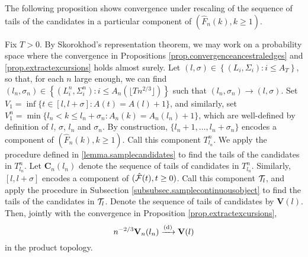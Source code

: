 The following proposition shows convergence under rescaling of the sequence of tails of the candidates in a particular component of $(\hat{F}_n(k),k\geq 1)$. 
\begin{proposition}\label{prop.convergencestartingpointscandidates}
Fix $T>0$. By Skorokhod's representation theorem, we may work on a probability space where the convergence in Propositions \ref{prop.convergenceancestraledges} and \ref{prop.extractexcursions} holds almost surely. Let $(l,\sigma)\in \left\{(L_i,\Sigma_i):i\leq A_T\right\}$, so that, for each $n$ large enough, we can find $(l_n,\sigma_n)\in\left\{(L_i^n,\Sigma_i^n):i\leq A_n\left(\lfloor Tn^{2/3}\rfloor\right)\right\}$ such that $(l_n,\sigma_n)\to (l,\sigma)$. Set $V_1=\inf\{t\in [l,l+\sigma]:A(t)=A(l)+1\}$, and similarly, set $V_1^n=\min\{l_n<k\leq l_n+\sigma_n:A_n(k)=A_n(l_n)+1\}$, which are well-defined by definition of $l$, $\sigma$, $l_n$ and $\sigma_n$. By construction, $\{l_n+1,\dots,l_n+\sigma_n\}$ encodes a component of $(\hat{F}_n(k),k\geq 1)$. Call this component $T^n_{l_n}$. We apply the procedure defined in \cref{lemma.samplecandidates} to find the tails of the candidates in $T^n_{l_n}$. Let $\mathbf{C}_n(l_n)$ denote the sequence of tails of candidates in $T^n_{l_n}$. Similarly, $[l,l+\sigma]$ encodes a component of $(\hat{{\mathcal F}}(t),t\geq 0)$. Call this component ${\mathcal T}_l$, and apply the procedure in Subsection \ref{subsubsec.samplecontinuousobject} to find the tails of the candidates in ${\mathcal T}_l$. Denote the sequence of tails of candidates by $\mathbf{V}(l)$. Then, jointly with the convergence in Proposition \ref{prop.extractexcursions}, 
$$n^{-2/3}\mathbf{V}_n(l_n)\xrightarrow[]{\mathrm{(d)}}\mathbf{V}(l)$$
in the product topology.
\end{proposition}
